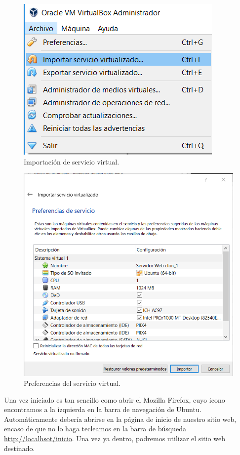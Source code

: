 \begin{figure}
\centering
\includegraphics[width=.9\textwidth]{img/instalacion_user_servicio}
\caption{Importación de servicio virtual.}
\label{fig:SerVir}
\end{figure}

\begin{figure}
\centering
\includegraphics[width=.9\textwidth]{img/instalacion_user}
\caption{Preferencias del servicio virtual.}
\label{fig:NueMaqVir}
\end{figure}

Una vez iniciado es tan sencillo como abrir el Mozilla Firefox, cuyo icono encontramos a la izquierda en la barra de navegación de Ubuntu. Automáticamente debería abrirse en la página de inicio de nuestro sitio web, encaso de que no lo haga tecleamos en la barra de búsqueda \url{http://localhsot/inicio}. Una vez ya dentro, podremos utilizar el sitio web destinado.

